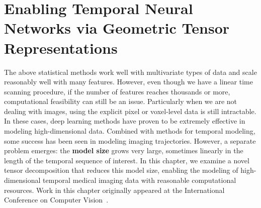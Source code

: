 \chapter{Enabling Temporal Neural Networks via Geometric Tensor Representations} \label{chap:ott} 
The above statistical methods work well with
multivariate types of data and scale reasonably well with many features.
However,
even though we have a linear time scanning procedure,
if the number of features reaches thousands or more,
computational feasibility can still be an issue.
Particularly when we are not dealing with
images,
using the explicit pixel or voxel-level
data is still intractable.
In these cases,
deep learning methods have
proven to be extremely effective
in modeling high-dimensional data.
Combined with methods
for temporal modeling,
some success has been seen
in modeling imaging trajectories.
However, a separate problem
emerges: the \textbf{model size}
grows very large, sometimes linearly 
in the length of the temporal sequence of interest.
In this chapter, we examine
a novel tensor decomposition
that reduces this model size,
enabling the modeling of high-dimensional
temporal medical imaging data
with reasonable computational resources.
Work in this chapter originally appeared at
the International Conference on Computer Vision~\citep{ott}.



%



